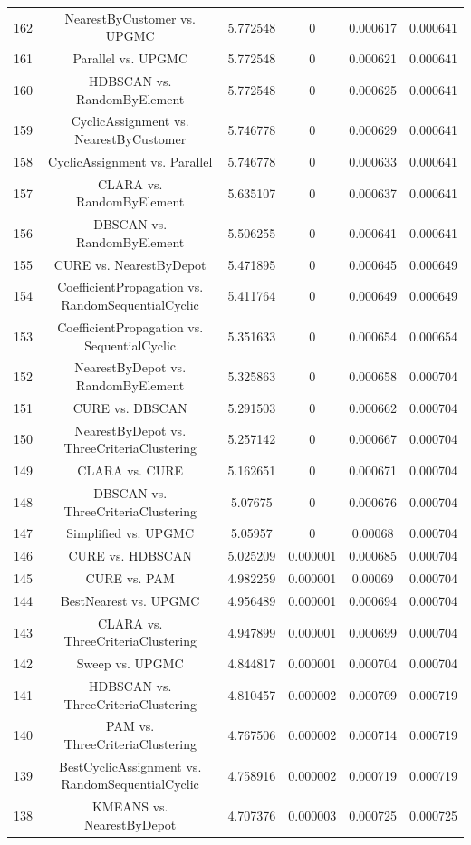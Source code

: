 \documentclass[a4paper,10pt]{article}
\begin{document}
\begin{landscape}
\begin{table}[!htp]
\begin{tabular}{cccccc}
162&NearestByCustomer vs. UPGMC&5.772548&0&0.000617&0.000641\\
161&Parallel vs. UPGMC&5.772548&0&0.000621&0.000641\\
160&HDBSCAN vs. RandomByElement&5.772548&0&0.000625&0.000641\\
159&CyclicAssignment vs. NearestByCustomer&5.746778&0&0.000629&0.000641\\
158&CyclicAssignment vs. Parallel&5.746778&0&0.000633&0.000641\\
157&CLARA vs. RandomByElement&5.635107&0&0.000637&0.000641\\
156&DBSCAN vs. RandomByElement&5.506255&0&0.000641&0.000641\\
155&CURE vs. NearestByDepot&5.471895&0&0.000645&0.000649\\
154&CoefficientPropagation vs. RandomSequentialCyclic&5.411764&0&0.000649&0.000649\\
153&CoefficientPropagation vs. SequentialCyclic&5.351633&0&0.000654&0.000654\\
152&NearestByDepot vs. RandomByElement&5.325863&0&0.000658&0.000704\\
151&CURE vs. DBSCAN&5.291503&0&0.000662&0.000704\\
150&NearestByDepot vs. ThreeCriteriaClustering&5.257142&0&0.000667&0.000704\\
149&CLARA vs. CURE&5.162651&0&0.000671&0.000704\\
148&DBSCAN vs. ThreeCriteriaClustering&5.07675&0&0.000676&0.000704\\
147&Simplified vs. UPGMC&5.05957&0&0.00068&0.000704\\
146&CURE vs. HDBSCAN&5.025209&0.000001&0.000685&0.000704\\
145&CURE vs. PAM&4.982259&0.000001&0.00069&0.000704\\
144&BestNearest vs. UPGMC&4.956489&0.000001&0.000694&0.000704\\
143&CLARA vs. ThreeCriteriaClustering&4.947899&0.000001&0.000699&0.000704\\
142&Sweep vs. UPGMC&4.844817&0.000001&0.000704&0.000704\\
141&HDBSCAN vs. ThreeCriteriaClustering&4.810457&0.000002&0.000709&0.000719\\
140&PAM vs. ThreeCriteriaClustering&4.767506&0.000002&0.000714&0.000719\\
139&BestCyclicAssignment vs. RandomSequentialCyclic&4.758916&0.000002&0.000719&0.000719\\
138&KMEANS vs. NearestByDepot&4.707376&0.000003&0.000725&0.000725\\

\end{tabular}
\end{table}
\end{landscape}
\end{document}
